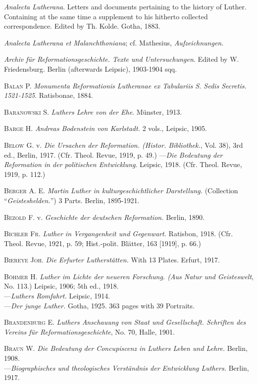 \textit{Analecta Lutherana}. Letters and documents pertaining to the history of
Luther. Containing at the same time a supplement to his hitherto collected
correspondence. Edited by Th. Kolde. Gotha, 1883.

\textit{Analecta Lutherana et Malanchthoniana}; cf. Mathesius, \textit{Aufzeichnungen}.

\textit{Archiv für Reformationsgeschichte. Texte und Untersuchungen}. Edited by
W. Friedensburg. Berlin (afterwards Leipsic), 1903-1904 sqq.

\textsc{Balan P.} \textit{Monumenta Reformationis Lutheranae ex Tabulariis S. Sedis
Secretis. 1521-1525}. Ratisbonae, 1884.

\textsc{Baranowski S.} \textit{Luthers Lehre von der Ehe}. Münster, 1913.

\textsc{Barge H.} \textit{Andreas Bodenstein von Karlstadt.} 2 vols., Leipsic, 1905.

\textsc{Below G.} v. \textit{Die Ursachen der Reformation. (Histor. Bibliothek.}, Vol. 38),
3rd ed., Berlin, 1917. (Cfr. Theol. Revue, 1919, p. 49.)
---\textit{Die Bedeutung der Reformation in der politischen Entwicklung}. Leipsic,
1918. (Cfr. Theol. Revue, 1919, p. 112.)

\textsc{Berger A. E.} \textit{Martin Luther in kulturgeschichtlicher Darstellung.} (Collection
“\textit{Geisteshelden.}”) 3 Parts. Berlin, 1895-1921.

\textsc{Bezold F.} v. \textit{Geschichte der deutschen Reformation.} Berlin, 1890.

\textsc{Bichler Fr.} \textit{Luther in Vergangenheit und Gegenwart.} Ratisbon, 1918. (Cfr.
Theol. Revue, 1921, p. 59; Hist.-polit. Blätter, 163 [1919], p. 66.)

\textsc{Biereye Joh.} \textit{Die Erfurter Lutherstätten.} With 13 Plates. Erfurt, 1917.

\textsc{Böhmer H.} \textit{Luther im Lichte der neueren Forschung. (Aus Natur und
Geisteswelt}, No. 113.) Leipsic, 1906; 5th ed., 1918. \\
---\textit{Luthers Romfahrt.} Leipsic, 1914. \\
---\textit{Der junge Luther.} Gotha, 1925. 363 pages with 39 Portraits.

\textsc{Brandenburg E.} \textit{Luthers Anschauung von Staat und Gesellschaft. Schriften
des Vereins für Reformationsgeschichte}, No. 70, Halle, 1901.

\textsc{Braun W.} \textit{Die Bedeutung der Concupiscenz in Luthers Leben und Lehre.}
Berlin, 1908. \\
---\textit{Biographisches und theologisches Verständnis der Entwicklung Luthers.}
Berlin, 1917.

